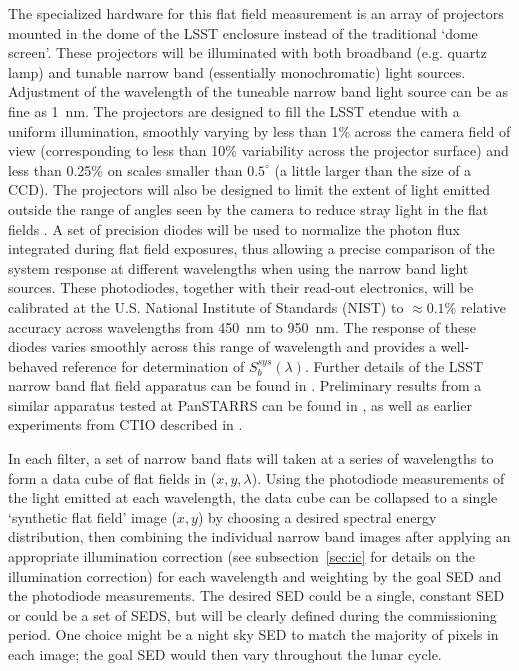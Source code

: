 \documentclass[12pt,preprint]{aastex}
\begin{document}
The specialized hardware for this flat field measurement is an array
of projectors mounted in the dome of the LSST enclosure instead of the
traditional `dome screen'. These projectors will be illuminated with
both broadband (e.g. quartz lamp) and tunable narrow band (essentially
monochromatic) light sources.  Adjustment of the wavelength of the
tuneable narrow band light source can be as fine as 1~nm. The
projectors are designed to fill the LSST etendue with a uniform
illumination, smoothly varying by less than 1\% across the camera
field of view (corresponding to less than 10\% variability across the
projector surface) and less than 0.25\% on scales smaller than
$0.5^{\circ}$ (a little larger than the size of a CCD).  The
projectors will also be designed to limit the extent of light emitted
outside the range of angles seen by the camera to reduce stray light
in the flat fields \citep{Gressler2010}. A set of precision diodes
will be used to normalize the photon flux integrated during flat field
exposures, thus allowing a precise comparison of the system response
at different wavelengths when using the narrow band light sources.
These photodiodes, together with their read-out electronics, will be
calibrated at the U.S. National Institute of Standards (NIST) to
$\approx0.1\%$ relative accuracy across wavelengths from 450~nm to
950~nm. The response of these diodes varies smoothly across this range
of wavelength and provides a well-behaved reference for determination
of $S_b^{sys}(\lambda)$.  Further details of the LSST narrow band flat
field apparatus can be found in \citet{Gressler2010}.  Preliminary
results from a similar apparatus tested at PanSTARRS can be found in
\citet{Stubbs2010a}, as well as earlier experiments from CTIO described
in \citet{Stubbs2007a}.

In each filter, a set of narrow band flats will taken at a series of
wavelengths to form a data cube of flat fields in
($x,y,\lambda$). Using the photodiode measurements of the light
emitted at each wavelength, the data cube can be collapsed to a single
`synthetic flat field' image ($x,y$) by choosing a desired spectral
energy distribution, then combining the individual narrow band images
after applying an appropriate illumination correction (see
subsection~\ref{sec:ic} for details on the illumination correction) for each
wavelength and weighting by the goal SED and the photodiode
measurements. The desired SED could be a single, constant SED or could
be a set of SEDS, but will be clearly defined during the commissioning
period. One choice might be a night sky SED to match the majority of
pixels in each image; the goal SED would then vary throughout the
lunar cycle.
\end{document}
